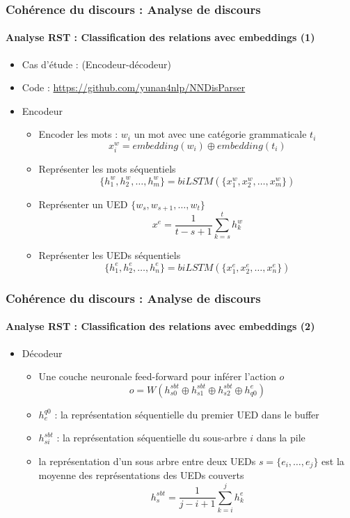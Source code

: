 \documentclass[xcolor=table]{beamer}
\begin{document}
\begin{frame}
	\frametitle{Cohérence du discours : Analyse de discours}
	\framesubtitle{Analyse RST : Classification des relations avec embeddings (1)}
	
	\begin{itemize}
		\item Cas d'étude : \cite{2018-yu-al} (Encodeur-décodeur)
		\item Code : \url{https://github.com/yunan4nlp/NNDisParser}
		\item Encodeur 
		\begin{itemize}
			\item Encoder les mots : $ w_i $ un mot avec une catégorie grammaticale $t_i$
			\[x_i^w = embedding(w_i) \oplus embedding(t_i)\]
			\item Représenter les mots séquentiels
			\[ \{h_1^w, h_2^w, \ldots, h_m^w \} = biLSTM(\{x_1^w, x_2^w, \ldots, x_m^w \})\]
			\item Représenter un UED $\{w_s, w_{s+1}, \ldots, w_t \}$
			\[ x^e = \frac{1}{t-s+1} \sum_{k=s}^{t} h_k^w\]
			\item Représenter les UEDs séquentiels
			\[ \{h_1^e, h_2^e, \ldots, h_n^e \} = biLSTM(\{x_1^e, x_2^e, \ldots, x_n^e \})\]
		\end{itemize}
	\end{itemize}
	
\end{frame}

\begin{frame}
	\frametitle{Cohérence du discours : Analyse de discours}
	\framesubtitle{Analyse RST : Classification des relations avec embeddings (2)}
	
	\begin{itemize}
		\item Décodeur 
		\begin{itemize}
			\item Une couche neuronale feed-forward pour inférer l'action $o$
			\[o = W(h_{s0}^{sbt} \oplus h_{s1}^{sbt} \oplus h_{s2}^{sbt} \oplus h_{q0}^{e})\]
			\item $ h_{e}^{q0} $ : la représentation séquentielle du premier UED dans le buffer
			\item $h_{si}^{sbt}$ : la représentation séquentielle du sous-arbre $i$ dans la pile
			\item la représentation d'un sous arbre entre deux UEDs $ s= \{e_i, \ldots, e_j\}$ est la moyenne des représentations des UEDs couverts
			\[ h_{s}^{sbt} = \frac{1}{j-i+1} \sum_{k=i}^{j} h_k^e\]
		\end{itemize}
	\end{itemize}
	
\end{frame}
\end{document}
